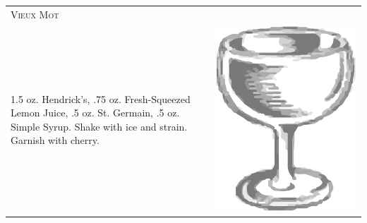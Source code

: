 \documentclass{article}
\begin{document}
\begin{tabular}{p{2in} p{0.5in}}
\multicolumn{2}{p{3in}}{\centering\Huge\textsc{Vieux Mot}} \\ 
   \vspace{-0.1in}1.5 oz. Hendrick's, .75 oz. Fresh-Squeezed Lemon Juice, .5 oz. St. Germain, .5 oz. Simple Syrup. Shake with ice and strain. Garnish with cherry. &
   \vspace{-0.1in} \includegraphics{coupe.png}
\end{tabular}
\end{document}
